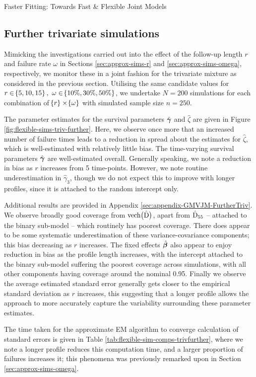 \begin{chapter}{\label{cha:flexible}Faster Fitting: Towards Fast \& Flexible Joint Models}
\subsection{Further trivariate simulations}\label{sec:flexible-sim-trivfurther}
Mimicking the investigations carried out into the effect of the follow-up length $r$ and failure rate $\omega$ in Sections \ref{sec:approx-sims-r} and \ref{sec:approx-sims-omega}, respectively, we monitor these in a joint fashion for the trivariate mixture as considered in the previous section. Utilising the same candidate values for $r\in\!\left\{5,10,15\right\},\ \omega\in\!\left\{10\%,30\%,50\%\right\}$, we undertake $N=200$ simulations for each combination of $\!\left\{ r\right\}\times\!\left\{\omega\right\}$ with simulated sample size $n=250$. 

The parameter estimates for the survival parameters $\hat{\bm{\gamma}}$ and $\hat{\zeta}$ are given in Figure \ref{fig:flexible-sims-triv-further}. Here, we observe once more that an increased number of failure times leads to a reduction in spread about the estimates for $\hat{\zeta}$, which is well-estimated with relatively little bias. The time-varying survival parameters $\hat{\bm{\gamma}}$ are well-estimated overall. Generally speaking, we note a reduction in bias as $r$ increases from 5 time-points. However, we note routine underestimation in $\hat{\gamma}_3$, though we do not expect this to improve with longer profiles, since it is attached to the random intercept only.

Additional results are provided in Appendix \ref{sec:appendix-GMVJM-FurtherTriv}. We observe broadly good coverage from $\text{vech}\big(\hat{\mathrm{D}}\big)$, apart from $\hat{\mathrm{D}}_{55}$ -- attached to the binary sub-model -- which routinely has poorest coverage. There does appear to be some systematic underestimation of these variance-covariance components; this bias decreasing as $r$ increases. The fixed effects $\hat{\bm{\beta}}$ also appear to enjoy reduction in bias as the profile length increases, with the intercept attached to the binary sub-model suffering the poorest coverage across simulations, with all other components having coverage around the nominal 0.95. Finally we observe the average estimated standard error generally gets closer to the empirical standard deviation as $r$ increases, this suggesting that a longer profile allows the approach to more accurately capture the variability surrounding these parameter estimates. 

The time taken for the approximate EM algorithm to converge calculation of standard errors is given in Table \ref{tab:flexible-sim-comps-trivfurther}, where we note a longer profile reduces this computation time, and a larger proportion of failures increases it; this phenomena was previously remarked upon in Section \ref{sec:approx-sims-omega}. 


\end{chapter}
